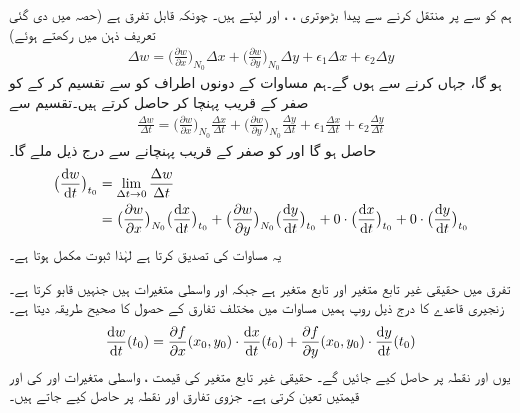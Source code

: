 ہم  کو  سے   پر منتقل کرنے سے پیدا بڑھوتری ، ،  اور  لیتے  ہیں۔ چونکہ  قابل تفرق ہے  (حصہ  میں دی گئی تعریف ذہن میں رکھتے ہوئے)
\begin{align}\label{مساوات_کثیرالمتغیر_زنجیری_دو_متغیرات_پ}
\Delta w=\big(\frac{\partial w}{\partial x}\big)_{N_0}\Delta x+\big(\frac{\partial w}{\partial y}\big)_{N_0}\Delta y+\epsilon_1\Delta x+\epsilon_2\Delta y
\end{align}
ہو گا، جہاں  کرنے سے  ہوں گے۔ہم مساوات  کے دونوں اطراف کو  سے تقسیم کر کے  کو صفر کے قریب پہنچا کر  حاصل کرتے ہیں۔تقسیم سے
\begin{align*}
\frac{\Delta w}{\Delta t}=\big(\frac{\partial w}{\partial x}\big)_{N_0}\frac{\Delta x}{\Delta t}+\big(\frac{\partial w}{\partial y}\big)_{N_0}\frac{\Delta y}{\Delta t}+\epsilon_1\frac{\Delta x}{\Delta t}+\epsilon_2\frac{\Delta y}{\Delta t}
\end{align*}
حاصل ہو گا اور  کو صفر کے قریب پہنچانے سے درج  ذیل ملے گا۔
\begin{align*}
\big(\frac{\dif w}{\dif t}\big)_{t_0}&=\lim_{\Delta t\to 0}\frac{\Delta w}{\Delta t}\\
&=\big(\frac{\partial w}{\partial x}\big)_{N_0}\big(\frac{\dif x}{\dif t}\big)_{t_0}+\big(\frac{\partial w}{\partial y}\big)_{N_0}\big(\frac{\dif y}{\dif t}\big)_{t_0}+0\cdot \big(\frac{\dif x}{\dif t}\big)_{t_0}+0\cdot \big(\frac{\dif y}{\dif t}\big)_{t_0}
\end{align*}
یہ مساوات  کی  تصدیق کرتا ہے لہٰذا ثبوت مکمل ہوتا ہے۔

تفرق  میں حقیقی غیر تابع متغیر  اور تابع متغیر  ہے جبکہ  اور   واسطی متغیرات ہیں جنہیں  قابو کرتا ہے۔زنجیری قاعدے  کا  درج ذیل روپ ہمیں  مساوات  میں مختلف تفارق کے حصول کا صحیح طریقہ دیتا ہے۔
\begin{align*}
\frac{\dif w}{\dif t}(t_0)=\frac{\partial f}{\partial x}(x_0,y_0)\cdot\frac{\dif x}{\dif t}(t_0)+\frac{\partial f}{\partial y}(x_0,y_0)\cdot\frac{\dif y}{\dif t}(t_0)
\end{align*} 
یوں  اور  نقطہ  پر حاصل کیے جائیں گے۔ حقیقی غیر تابع متغیر کی قیمت  ،  واسطی  متغیرات  اور  کی    اور  قیمتیں  تعین کرتی ہے۔ جزوی تفارق  اور  نقطہ  پر حاصل کیے جاتے ہیں۔ 


